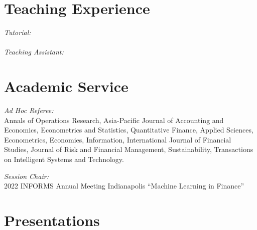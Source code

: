 \documentclass[margin]{res}
\begin{document}
\begin{resume}

\section{\sc Teaching Experience}

\textit{Tutorial:} \\
\\
\textit{Teaching Assistant:} \\


\section{\sc Academic Service}

\textit{Ad Hoc Referee:}  \\
Annals of Operations Research,
Asia-Pacific Journal of Accounting and Economics,
Econometrics and Statistics, 
Quantitative Finance,
Applied Sciences,
Econometrics,
Economies, 
Information,
International Journal of Financial Studies,
Journal of Risk and Financial Management,
Sustainability,
Transactions on Intelligent Systems and Technology.


\textit{Session Chair:}  \\
2022 INFORMS Annual Meeting Indianapolis “Machine Learning in Finance”

\vspace{5mm}

\section{\sc Presentations}


\end{resume}
\end{document}
